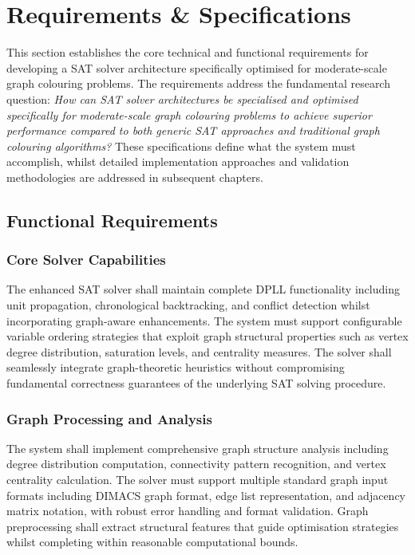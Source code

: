 \section{Requirements \& Specifications}

This section establishes the core technical and functional requirements for developing a SAT solver architecture specifically optimised for moderate-scale graph colouring problems. The requirements address the fundamental research question: \emph{How can SAT solver architectures be specialised and optimised specifically for moderate-scale graph colouring problems to achieve superior performance compared to both generic SAT approaches and traditional graph colouring algorithms?} These specifications define what the system must accomplish, whilst detailed implementation approaches and validation methodologies are addressed in subsequent chapters.

\subsection{Functional Requirements}

\subsubsection{Core Solver Capabilities}
The enhanced SAT solver shall maintain complete DPLL functionality including unit propagation, chronological backtracking, and conflict detection whilst incorporating graph-aware enhancements. The system must support configurable variable ordering strategies that exploit graph structural properties such as vertex degree distribution, saturation levels, and centrality measures. The solver shall seamlessly integrate graph-theoretic heuristics without compromising fundamental correctness guarantees of the underlying SAT solving procedure.

\subsubsection{Graph Processing and Analysis}
The system shall implement comprehensive graph structure analysis including degree distribution computation, connectivity pattern recognition, and vertex centrality calculation. The solver must support multiple standard graph input formats including DIMACS graph format, edge list representation, and adjacency matrix notation, with robust error handling and format validation. Graph preprocessing shall extract structural features that guide optimisation strategies whilst completing within reasonable computational bounds.

